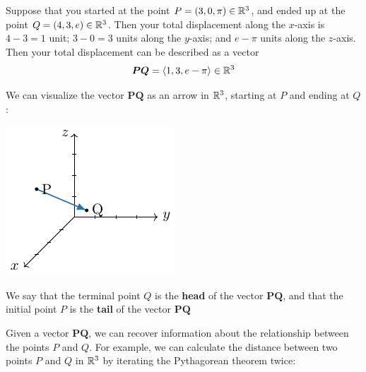 \begin{example}
Suppose that you started at the point $P = (3, 0, \pi) \in \mathbb{R}^3$, and ended up at the point $Q = (4, 3, e) \in \mathbb{R}^3$.  Then your total displacement along the $x$-axis is $4-3=1$ unit; $3-0=3$ units along the $y$-axis; and $e-\pi$ units along the $z$-axis.  Then your total displacement can be described as a vector
$$\bm{PQ} = \langle 1, 3, e-\pi \rangle \in \mathbb{R}^3$$

We can visualize the vector $\bm{PQ}$ as an arrow in $\mathbb{R}^3$, starting at $P$ and ending at $Q$:

 \begin{center}        
        \includegraphics{chapters/1-LinearAlgebra/figures/figures-vectorPQ.pdf}
    \end{center}

We say that the terminal point $Q$ is the \textbf{head} of the vector $\bm{PQ}$, and that the initial point $P$ is the \textbf{tail} of the vector $\bm{PQ}$

\end{example}


Given a vector $\bm{PQ}$, we can recover information about the relationship between the points $P$ and $Q$.  For example, we can calculate the distance between two points $P$ and $Q$ in $\mathbb{R}^3$ by iterating the Pythagorean theorem twice:

